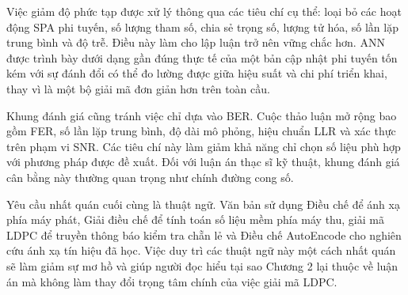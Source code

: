 Việc giảm độ phức tạp được xử lý thông qua các tiêu chí cụ thể: loại bỏ các hoạt động SPA phi tuyến, số lượng tham số, chia sẻ trọng số, lượng tử hóa, số lần lặp trung bình và độ trễ. Điều này làm cho lập luận trở nên vững chắc hơn. ANN được trình bày dưới dạng gần đúng thực tế của một bản cập nhật phi tuyến tốn kém với sự đánh đổi có thể đo lường được giữa hiệu suất và chi phí triển khai, thay vì là một bộ giải mã đơn giản hơn trên toàn cầu.

Khung đánh giá cũng tránh việc chỉ dựa vào BER. Cuộc thảo luận mở rộng bao gồm FER, số lần lặp trung bình, độ dài mô phỏng, hiệu chuẩn LLR và xác thực trên phạm vi SNR. Các tiêu chí này làm giảm khả năng chỉ chọn số liệu phù hợp với phương pháp được đề xuất. Đối với luận án thạc sĩ kỹ thuật, khung đánh giá cân bằng này thường quan trọng như chính đường cong số.

Yêu cầu nhất quán cuối cùng là thuật ngữ. Văn bản sử dụng Điều chế để ánh xạ phía máy phát, Giải điều chế để tính toán số liệu mềm phía máy thu, giải mã LDPC để truyền thông báo kiểm tra chẵn lẻ và Điều chế AutoEncode cho nghiên cứu ánh xạ tín hiệu đã học. Việc duy trì các thuật ngữ này một cách nhất quán sẽ làm giảm sự mơ hồ và giúp người đọc hiểu tại sao Chương 2 lại thuộc về luận án mà không làm thay đổi trọng tâm chính của việc giải mã LDPC.
